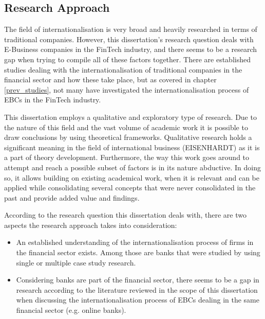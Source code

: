 \documentclass[11pt,a4paper]{article}
\begin{document}
{\subsection{Research Approach} %
The field of internationalisation is very broad and heavily researched in terms of traditional companies. However, this dissertation's research question deals with E-Business companies in the FinTech industry, and there seems to be a research gap when trying to compile all of these factors together. There are established studies dealing with the internationalisation of traditional companies in the financial sector and how these take place, but as covered in chapter \ref{prev_studies}, not many have investigated the internationalisation process of EBCs in the FinTech industry. \par
This dissertation employs a qualitative and exploratory type of research. Due to the nature of this field and the vast volume of academic work it is possible to draw conclusions by using theoretical frameworks. Qualitative research holds a significant meaning in the field of international business (EISENHARDT) as it is a part of theory development. Furthermore, the way this work goes around to attempt and reach a possible subset of factors is in its nature abductive.  In doing so, it allows building on existing academical work, when it is relevant and can be applied while consolidating several concepts that were never consolidated in the past and provide added value and findings. \par %
According to the research question this dissertation deals with, there are two aspects the research approach takes into consideration:
\begin{itemize}
 \item {An established understanding of the internationalisation process of firms in the financial sector exists. Among those are banks that were studied by using single or multiple case study research.}
 \item{Considering banks are part of the financial sector, there seems to be a gap in research according to the literature reviewed in the scope of this dissertation when discussing the internationalisation process of EBCs dealing in the same financial sector (e.g. online banks). }
\end{itemize}



}
\end{document}

